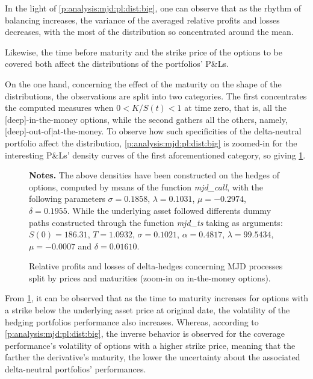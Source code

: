 \documentclass[a4paper, 12pt]{report}
\begin{document}
In the light of \cref{p:analysis:mjd:pl:dist:big}, one can observe that as the rhythm of balancing increases, the variance of the averaged relative profits and losses decreases, with the most of the distribution so concentrated around the mean.

Likewise,  the time before maturity and the strike price of the options to be covered both affect the distributions of the portfolios' P\&Ls.
%

On the one hand, concerning the effect of the maturity on the shape of the distributions, the observations are split into two categories.
The first concentrates the computed measures when $0 < K/S(t) < 1$ at time zero, that is, all the [deep]-in-the-money options, while the second gathers all the others, namely, [deep]-out-of|at-the-money. 
To observe how such specificities of the delta-neutral portfolio affect the distribution, \cref{p:analysis:mjd:pl:dist:big} is zoomed-in for the interesting P\&Ls' density curves of the first aforementioned category, so giving \cref{p:analysis:mjd:pl:dist:in}.


\begin{figure}[h]
  \centering
  
  \caption{Relative profits and losses of delta-hedges concerning MJD processes split by prices and maturities (zoom-in on in-the-money options).}
  \begin{changemargin}{0.5cm}{0.5cm}
  \medskip
\footnotesize
{}\textbf{Notes.} The above densities have been constructed on the hedges of options, computed by means of the function \textit{mjd\_call}, with the following parameters $\sigma = 0.1858$, $\lambda = 0.1031$, $\mu = -0.2974$, $\delta = 0.1955$. While the underlying asset followed differents dummy paths constructed through the function \textit{mjd\_ts} taking as arguments: $S(0) = 186.31$, $T = 1.0932$, $\sigma = 0.1021$, $\alpha = 0.4817$, $\lambda = 99.5434$, $\mu = -0.0007$ and $\delta = 0.01610$. 
  \end{changemargin}
  \label{p:analysis:mjd:pl:dist:in}
\end{figure}

From \cref{p:analysis:mjd:pl:dist:in}, it can be observed that as the time to maturity increases for options with a strike below the underlying asset price at original date, the volatility of the hedging portfolios performance also increases.
Whereas, according to \cref{p:analysis:mjd:pl:dist:big}, the inverse behavior is observed for the coverage performance's volatility of options with a higher strike price, meaning that the farther the derivative's maturity, the lower the uncertainty about the associated delta-neutral portfolios' performances.
\end{document}
